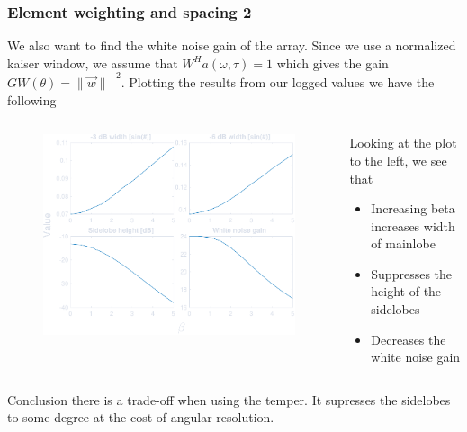 \documentclass[compress]{beamer}
\newcommand{\norm}[1]{\ensuremath{\lVert#1\rVert}}
\begin{document}
\begin{frame} %
    \frametitle{Element weighting and spacing 2}
    We also want to find the white noise gain of the array.
    Since we use a normalized kaiser window, we assume that
    $W^Ha\left(\omega,\tau\right) = 1$ which gives the gain
    $ GW\left(\theta\right)=\norm{\vec{w}}^{-2} $. Plotting the results from
    our logged values we have the following
    \begin{columns}
        \begin{column}{0.5\textwidth}
            \begin{figure}
                \includegraphics[width=\columnwidth]{"../5.pdf"}
            \end{figure}
        \end{column}
        \begin{column}{0.5\textwidth}
            Looking at the plot to the left, we see that 
            \begin{itemize}
                \item Increasing beta increases width of mainlobe
                \item Suppresses the height of the sidelobes
                \item Decreases the white noise gain
            \end{itemize}
        \end{column}
    \end{columns}
    Conclusion there is a trade-off when using the temper. It supresses the 
    sidelobes to some degree at the cost of angular resolution.
\end{frame}
\end{document}
